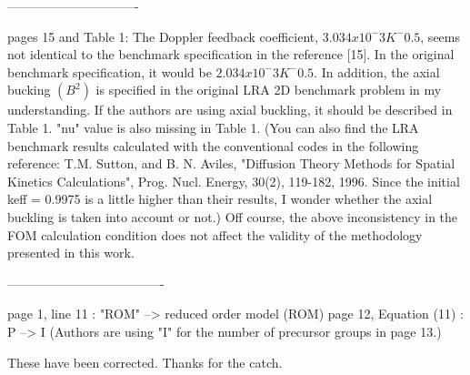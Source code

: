 \documentclass[10pt]{article}
\begin{document}
-------------------------------


\begin{response}
{ pages 15 and Table 1:
	The Doppler feedback coefficient, $3.034x10^-3 K^-0.5$, seems not identical to the benchmark specification in the reference [15]. In the original benchmark specification, it would be $2.034x10^-3 K^-0.5$.
	In addition, the axial bucking $(B^2)$ is specified in the original LRA 2D benchmark problem in my understanding. If the authors are using axial buckling, it should be described in Table 1. "nu" value is also missing in Table 1.
	(You can also find the LRA benchmark results calculated with the conventional codes in the following reference:
	T.M. Sutton, and B. N. Aviles, "Diffusion Theory Methods for Spatial Kinetics Calculations", Prog. Nucl. Energy, 30(2), 119-182, 1996.
	Since the initial keff = 0.9975 is a little higher than their results, I wonder whether the axial buckling is taken into account or not.)
	Off course, the above inconsistency in the FOM calculation condition does not affect the validity of the methodology presented in this work.}

-------------------------------------
\end{response}

\begin{response}
{
 page 1, line 11 : "ROM" --> reduced order model (ROM)
 page 12, Equation (11) : P --> I (Authors are using "I" for the number of precursor groups in page 13.)}

\end{response}
These have been corrected. Thanks for the catch.
\end{document}
